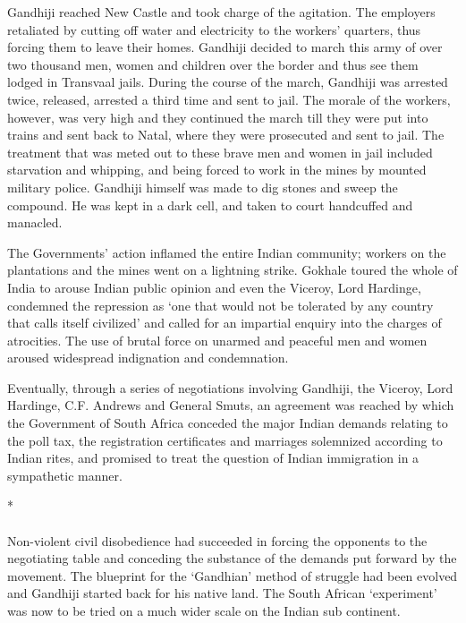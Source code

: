 Gandhiji reached New Castle and took charge of the agitation. The employers retaliated by cutting off water and electricity to the workers' quarters, thus forcing them to leave their homes. Gandhiji decided to march this army of over two thousand men, women and children over the border and thus see them lodged in Transvaal jails. During the course of the march, Gandhiji was arrested twice, released, arrested a third time and sent to jail. The morale of the workers, however, was very high and they continued the march till they were put into trains and sent back to Natal, where they were prosecuted and sent to jail. The treatment that was meted out to these brave men and women in jail included starvation and whipping, and being forced to work in the mines by mounted military police. Gandhiji himself was made to dig stones and sweep the compound. He was kept in a dark cell, and taken to court handcuffed and manacled.

The Governments' action inflamed the entire Indian community; workers on the plantations and the mines went on a lightning strike. Gokhale toured the whole of India to arouse Indian public opinion and even the Viceroy, Lord Hardinge, condemned the repression as `one that would not be tolerated by any country that calls itself civilized' and called for an impartial enquiry into the charges of atrocities. The use of brutal force on unarmed and peaceful men and women aroused widespread indignation and condemnation.

Eventually, through a series of negotiations involving Gandhiji, the Viceroy, Lord Hardinge, C.F. Andrews and General Smuts, an agreement was reached by which the Government of South Africa conceded the major Indian demands relating to the poll tax, the registration certificates and marriages solemnized according to Indian rites, and promised to treat the question of Indian immigration in a sympathetic manner.

\begin{center}*\end{center}

\paragraph*{}


Non-violent civil disobedience had succeeded in forcing the opponents to the negotiating table and conceding the substance of the demands put forward by the movement. The blueprint for the `Gandhian' method of struggle had been evolved and Gandhiji started back for his native land. The South African `experiment' was now to be tried on a much wider scale on the Indian sub­ continent.


